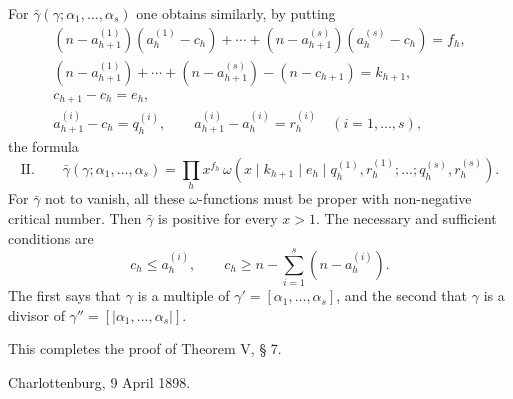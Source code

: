 For $\bar\gamma(\gamma;\alpha_1,
\ldots,\alpha_s)$ one obtains similarly, by putting
\[
\begin{gathered}
 (n-a_{h+1}^{(1)})(a_h^{(1)}-c_h)+\cdots+(n-a_{h+1}^{(s)})(a_h^{(s)}-c_h)=f_h,\\
 (n-a_{h+1}^{(1)})+\cdots+(n-a_{h+1}^{(s)})-(n-c_{h+1})=k_{h+1},\\
 c_{h+1}-c_h=e_h,\\
 a_{h+1}^{(i)}-c_h=q_h^{(i)},
 \qquad a_{h+1}^{(i)}-a_h^{(i)}=r_h^{(i)}\quad(i=1,\ldots,s),
\end{gathered}
\]
the formula
\[
\text{II.}\qquad
 \bar\gamma(\gamma;\alpha_1,
\ldots,\alpha_s)=\prod_h x^{f_h}\,
 \omega(x\mid k_{h+1}\mid e_h\mid q_h^{(1)},r_h^{(1)};\ldots;q_h^{(s)},r_h^{(s)}).
\]
For $\bar\gamma$ not to vanish, all these $\omega$-functions must be proper with non-negative critical number. Then $\bar\gamma$ is positive for every $x>1$. The necessary and sufficient conditions are
\[
 c_h\le a_h^{(i)},
 \qquad
 c_h\ge n-\sum_{i=1}^s(n-a_h^{(i)}).
\]
The first says that $\gamma$ is a multiple of $\gamma'=[\alpha_1,
\ldots,\alpha_s]$, and the second that $\gamma$ is a divisor of $\gamma''=[|\alpha_1,
\ldots,\alpha_s|]$.

This completes the proof of Theorem V, § 7.

Charlottenburg, 9 April 1898.
